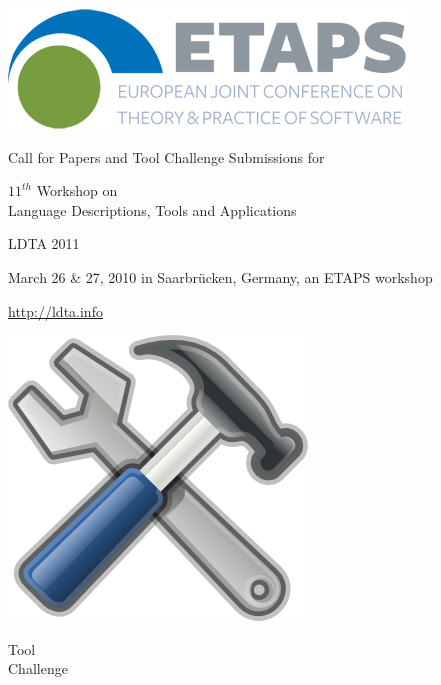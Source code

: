 \documentclass[10pt]{article}
\begin{document}
\noindent
\begin{minipage}[b][1.6in][t]{1in}
\includegraphics[width=1.0\columnwidth]{images/etapsLogo.png}

\end{minipage}
\begin{minipage}[b][1.6in][t]{5in}
\begin{center}
Call for Papers and Tool Challenge Submissions for

\vspace{2mm}

{\Large $11^{th}$ Workshop on \\
Language Descriptions, Tools and Applications}

\vspace{3mm}

{\Large LDTA 2011}

\vspace{3mm}

March 26 \& 27, 2010 in Saarbr\"ucken, Germany, an ETAPS workshop

\vspace{2mm}

\url{http://ldta.info}
\end{center}
\end{minipage}
\begin{minipage}[b][1.6in][t]{1in}
\includegraphics[width=1.0\columnwidth]{images/Tools.png}
\vspace{-8mm}
\begin{center}
Tool \\
Challenge
\end{center}
\end{minipage}
\end{document}
